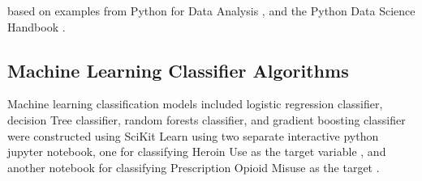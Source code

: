 \documentclass[sigconf]{acmart}
\begin{document}
based on examples from Python for Data Analysis \cite{mckinney17}, and the 
Python Data Science Handbook \cite{vanderplas17}.  

\subsection{Machine Learning Classifier Algorithms}
Machine learning classification models included logistic regression classifier, 
decision Tree classifier, random forests classifier, and gradient boosting 
classifier were constructed using SciKit Learn \cite{muller17, raschka17} 
using two separate interactive python jupyter notebook, one for classifying 
Heroin Use as the target variable \cite{classifyH}, and another notebook for classifying Prescription Opioid Misuse as the target \cite{classifyPRL}. 





%
\end{document}
